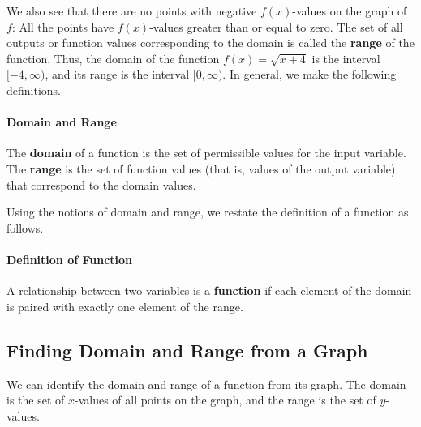 \documentclass[10pt,]{book}
\newcommand{\terminology}[1]{\textbf{#1}}
\theoremstyle{plain}
\theoremstyle{definition}
\theoremstyle{definition}
\begin{document}
    We also see that there are no points with negative \(f (x)\)-values on the graph of \(f\): All the points have \(f (x)\)-values greater than or equal to zero. The set of all outputs or function values corresponding to the domain is called the \terminology{range} of the function. Thus, the domain of the function \(f (x) =\sqrt{x + 4}\) is the interval \([−4, \infty)\), and its range is the interval \([0, \infty)\). In general, we make the following definitions.
%
\typeout{************************************************}
\typeout{************************************************}
\paragraph[Domain and Range]{Domain and Range}\label{paragraphs-3}
%
\par

    The \terminology{domain} of a function is the set of permissible values for the input variable. The \terminology{range} is the set of function values (that is, values of the output variable) that correspond to the domain values.
%
\par

    Using the notions of domain and range, we restate the definition of a function as follows.
%
\typeout{************************************************}
\typeout{************************************************}
\paragraph[Definition of Function]{Definition of Function}\label{paragraphs-4}
%
\par

    A relationship between two variables is a \terminology{function} if each element of the domain is paired with exactly one element of the range.
%
\typeout{************************************************}
\typeout{************************************************}
\subsection[Finding Domain and Range from a Graph]{Finding Domain and Range from a Graph}\label{subsection-6}

    We can identify the domain and range of a function from its graph. The domain is the set of \(x\)-values of all points on the graph, and the range is the set of \(y\)-values.
%
\end{document}
